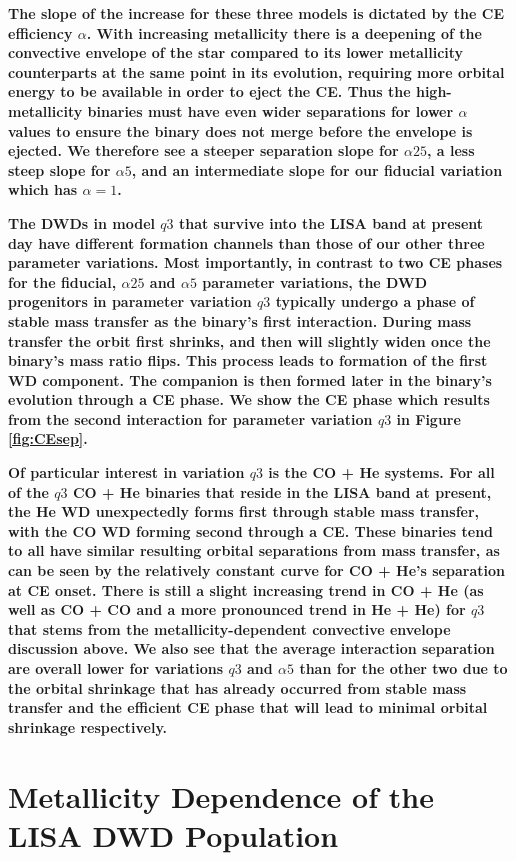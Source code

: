 \documentclass[twocolumn, linenumbers]{aastex631}
\begin{document}
\textbf{The slope of the increase for these three models is dictated by the CE efficiency $\alpha$. With increasing metallicity there is a deepening of the convective envelope of the star compared to its lower metallicity counterparts at the same point in its evolution, requiring more orbital energy to be available in order to eject the CE. Thus the high-metallicity binaries must have even wider separations for lower $\alpha$ values to ensure the binary does not merge before the envelope is ejected. We therefore see a steeper separation slope for $\alpha25$, a less steep slope for $\alpha5$, and an intermediate slope for our fiducial variation which has $\alpha=1$.}

\textbf{The DWDs in model $q3$ that survive into the LISA band at present day have different formation channels than those of our other three parameter variations. Most importantly, in contrast to two CE phases for the fiducial, $\alpha25$ and $\alpha5$ parameter variations, the DWD progenitors in parameter variation $q3$ typically undergo a phase of stable mass transfer as the binary's first interaction. During mass transfer the orbit first shrinks, and then will slightly widen once the binary's mass ratio flips. This process leads to formation of the first WD component. The companion is then formed later in the binary's evolution through a CE phase. We show the CE phase which results from the second interaction for parameter variation $q3$ in Figure \ref{fig:CEsep}.}

\textbf{Of particular interest in variation $q3$ is the CO + He systems. For all of the $q3$ CO + He binaries that reside in the LISA band at present, the He WD unexpectedly forms first through stable mass transfer, with the CO WD forming second through a CE. These binaries tend to all have similar resulting orbital separations from mass transfer, as can be seen by the relatively constant curve for CO + He's separation at CE onset. There is still a slight increasing trend in CO + He (as well as CO + CO and a more pronounced trend in He + He) for $q3$ that stems from the metallicity-dependent convective envelope discussion above. We also see that the average interaction separation are overall lower for variations $q3$ and $\alpha5$ than for the other two due to the orbital shrinkage that has already occurred from stable mass transfer and the efficient CE phase that will lead to minimal orbital shrinkage respectively.}

\section{Metallicity Dependence of the LISA DWD Population}
\label{sec:LISA_met}
\end{document}
